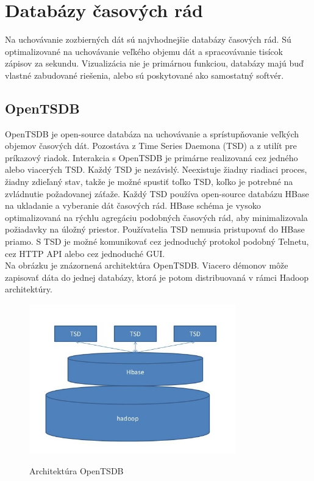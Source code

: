 \documentclass[printed,11pt,twoside,color,cover,table]{fithesis3}
\begin{document}
\section{Databázy časových rád}
Na uchovávanie zozbierných dát sú najvhodnejšie databázy časových rád. Sú optimalizované na uchovávanie veľkého objemu dát a spracovávanie tisícok zápisov za sekundu. Vizualizácia nie je primárnou funkciou,
databázy majú buď vlastné zabudované riešenia, alebo sú poskytované ako samostatný softvér.

\subsection{OpenTSDB}
OpenTSDB je open-source databáza na uchovávanie a sprístupňovanie veľkých objemov časových dát. Pozostáva z Time Series Daemona (TSD) a z utilít pre príkazový riadok. Interakcia s OpenTSDB je primárne 
realizovaná cez jedného alebo viacerých TSD. Každý TSD je nezávislý.
Neexistuje žiadny riadiaci proces, žiadny zdieľaný stav, takže je možné spustiť toľko TSD, koľko je potrebné na zvládnutie požadovanej záťaže. Každý TSD používa open-source databázu HBase
na ukladanie a vyberanie dát časových rád. HBase schéma je vysoko optimalizovaná na rýchlu agregáciu podobných časových rád, aby minimalizovala požiadavky na úložný priestor. 
Používatelia TSD nemusia pristupovať do HBase priamo. S TSD je možné komunikovať cez jednoduchý protokol podobný Telnetu, cez HTTP API alebo cez jednoduché GUI.\cite{openTSDB}
\\Na obrázku je znázornená architektúra OpenTSDB. Viacero démonov môže zapisovať dáta do jednej databázy, ktorá je potom distribuovaná v rámci Hadoop architektúry.
\begin{figure}[h]
\begin{center}
       \includegraphics[width=0.8\textwidth]{images/opentsdb-arch.jpg}
       \caption{Architektúra OpenTSDB}\cite{opentsdb-arch}
\end{center}
\end{figure}
\end{document}
